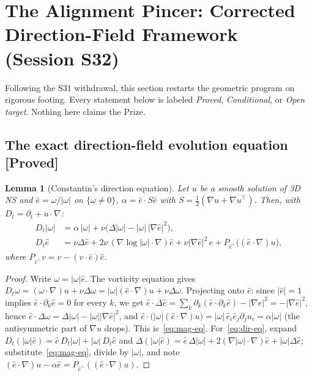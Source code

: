 \documentclass[11pt]{article}
\newtheorem{lemma}[theorem]{Lemma}
\theoremstyle{definition}
\theoremstyle{remark}
\begin{document}
\section{The Alignment Pincer: Corrected Direction-Field Framework (Session S32)}
\label{sec:pincer-s32}

Following the S31 withdrawal, this section restarts the geometric program on
rigorous footing. Every statement below is labeled \emph{Proved},
\emph{Conditional}, or \emph{Open target}. Nothing here claims the Prize.

\subsection{The exact direction-field evolution equation [Proved]}

\begin{lemma}[Constantin's direction equation]\label{lem:direction-eq}
  Let $u$ be a smooth solution of 3D NS and $\hat{e}=\omega/|\omega|$ on
  $\{\omega\neq 0\}$, $\alpha = \hat{e}\cdot S\hat{e}$ with
  $S=\tfrac12(\nabla u + \nabla u^{\top})$. Then, with
  $D_t = \partial_t + u\cdot\nabla$:
  \begin{align}
    D_t|\omega| &= \alpha\,|\omega| + \nu\bigl(\Delta|\omega| - |\omega|\,|\nabla\hat{e}|^2\bigr),
      \label{eq:mag-eq}\\
    D_t\hat{e} &= \nu\Delta\hat{e} + 2\nu\,(\nabla\log|\omega|\cdot\nabla)\hat{e}
      + \nu|\nabla\hat{e}|^2\,\hat{e} + P_{\hat{e}^{\perp}}\bigl((\hat{e}\cdot\nabla)u\bigr),
      \label{eq:dir-eq}
  \end{align}
  where $P_{\hat{e}^{\perp}}v = v - (v\cdot\hat{e})\hat{e}$.
\end{lemma}

\begin{proof}
  Write $\omega=|\omega|\hat{e}$. The vorticity equation gives
  $D_t\omega = (\omega\cdot\nabla)u + \nu\Delta\omega
  = |\omega|(\hat{e}\cdot\nabla)u + \nu\Delta\omega$.
  Projecting onto $\hat{e}$: since $|\hat{e}|=1$ implies
  $\hat{e}\cdot\partial_k\hat{e}=0$ for every $k$, we get
  $\hat{e}\cdot\Delta\hat{e} = \sum_k \partial_k(\hat{e}\cdot\partial_k\hat{e})
  - |\nabla\hat{e}|^2 = -|\nabla\hat{e}|^2$, hence
  $\hat{e}\cdot\Delta\omega = \Delta|\omega| - |\omega||\nabla\hat{e}|^2$,
  and $\hat{e}\cdot\bigl(|\omega|(\hat{e}\cdot\nabla)u\bigr)
  = |\omega|\,\hat{e}_i\hat{e}_j\partial_j u_i = \alpha|\omega|$
  (the antisymmetric part of $\nabla u$ drops). This is~\eqref{eq:mag-eq}.
  For~\eqref{eq:dir-eq}, expand
  $D_t(|\omega|\hat{e}) = \hat{e}\,D_t|\omega| + |\omega|\,D_t\hat{e}$ and
  $\Delta(|\omega|\hat{e}) = \hat{e}\,\Delta|\omega|
  + 2(\nabla|\omega|\cdot\nabla)\hat{e} + |\omega|\Delta\hat{e}$;
  substitute~\eqref{eq:mag-eq}, divide by $|\omega|$, and note
  $(\hat{e}\cdot\nabla)u - \alpha\hat{e} = P_{\hat{e}^{\perp}}((\hat{e}\cdot\nabla)u)$.
\end{proof}
\end{document}
